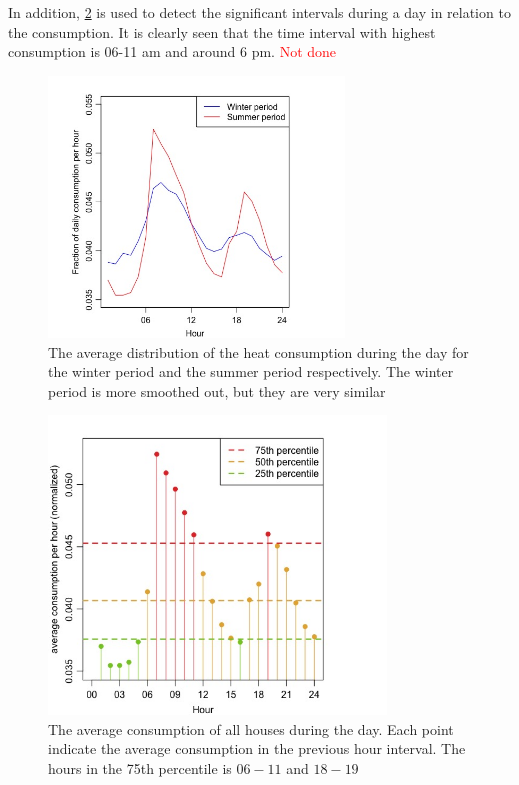 \noindent In addition, \cref{fig:HourDistribution} is used to detect the significant intervals during a day in relation to the consumption. It is clearly seen that the time interval with highest consumption is 06-11 am and around 6 pm. \textcolor{red}{Not done}

\begin{figure}
    \centering
    \includegraphics[width=0.7\textwidth]{../../../figures/Season_distribution.jpeg}
    \caption{The average distribution of the heat consumption during the day for the winter period and the summer period respectively. The winter period is more smoothed out, but they are very similar}
    \label{fig: Season_dist}
\end{figure}

\begin{figure}
    \centering
    \includegraphics[width=0.8\textwidth]{../../../figures/HourDistribution.jpeg}
    \caption{The average consumption of all houses during the day. Each point indicate the average consumption in the previous hour interval. The hours in the 75th percentile is $06-11$ and $18-19$}
    \label{fig:HourDistribution}
\end{figure}


